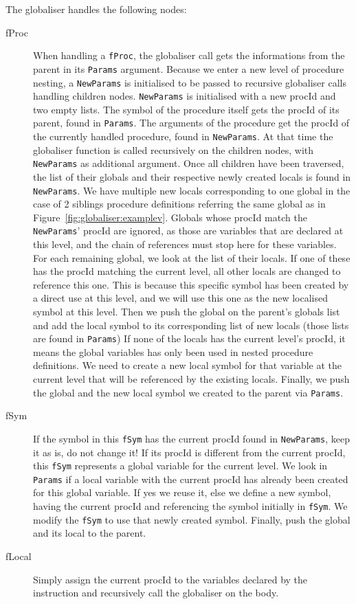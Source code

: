 \documentclass[a4paper]{memoir}
\begin{document}
The globaliser handles the following nodes:
\begin{description}
   \item[fProc] When handling a \lstinline!fProc!, the globaliser call gets the
     informations from the parent in its \lstinline!Params! argument. Because we
     enter a new level of procedure nesting, a \lstinline!NewParams! is
     initialised to be passed to recursive globaliser calls handling children
     nodes. \lstinline!NewParams! is initialised with a new procId and two empty lists. 
      The symbol of the procedure itself gets the procId of its parent, found in \lstinline!Params!. The arguments of the procedure get the procId of the currently handled procedure, found in \lstinline!NewParams!. At that time the globaliser function is called recursively on the children nodes, with \lstinline!NewParams! as additional argument.
      Once all children have been traversed, the list of their globals and their
      respective newly created locals is found in \lstinline!NewParams!.  We
      have multiple new locals corresponding to one global in the case of 2
      siblings procedure definitions referring the same global as in
      Figure~\ref{fig:globaliser:examplev}. 
      Globals whose procId match the \lstinline!NewParams!' procId are ignored, as those are variables that are declared at this level, and the chain of references must stop here for these variables.
      For each remaining global, we look at the list of their locals. 
      If one of these has the procId matching the current level, all other locals are changed to reference this one. This is because this specific symbol has been created by a direct use at this level, and we will use this one as the new localised symbol at this level. Then we push the global on the parent's globals list and add the local symbol to its corresponding list of new locals (those lists are found in \lstinline!Params!)
      If none of the locals has the current level's procId, it means the global variables has only been used in nested procedure definitions. We need to create a new local symbol for that variable at the current level that will be referenced by the existing locals. Finally, we push the global and the new local symbol we created to the parent via \lstinline!Params!. 
   \item[fSym] If the symbol in this \lstinline!fSym! has the current procId found in \lstinline!NewParams!, keep it as is, do not change it!  If its procId is different from the current procId, this \lstinline!fSym! represents a global variable for the current level. We look in \lstinline!Params! if a local variable with the current procId has already been created for this global variable. If yes we reuse it, else we define a new symbol, having the current procId and referencing the symbol initially in \lstinline!fSym!. We modify the \lstinline!fSym! to use that newly created symbol. Finally, push the global and its local to the parent.
   \item[fLocal] Simply assign the current procId to the variables declared by the instruction and recursively call the globaliser on the body.
\end{description}
\end{document}
